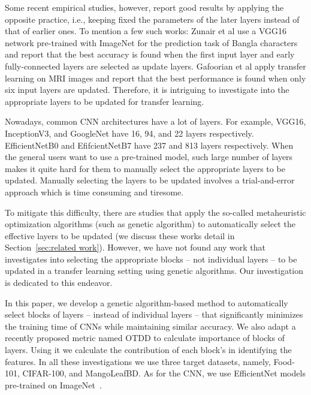 \documentclass[a4paper,fleqn]{cas-sc}
\begin{document}
Some recent empirical studies, however, report good results by applying the opposite practice, i.e., keeping fixed the parameters of the later layers instead of that of earlier ones. To mention a few such works: Zunair et al \cite{ZunairMuhammedMomen2018} use a VGG16 network \cite{ShimonyanZisserman2015} pre-trained with ImageNet for the prediction task of Bangla characters and report that the best accuracy is found when the first input layer and early fully-connected layers are selected as update layers. Gafoorian et al \cite{Ghafoorian2017} apply transfer learning on MRI images and report that the best performance is found when only six input layers are updated. Therefore, it is intriguing to investigate into the appropriate  layers to be updated for transfer learning.


Nowadays, common CNN architectures have a lot of layers. For example, VGG16, InceptionV3, and GoogleNet have 16, 94, and 22 layers respectively. EfficientNetB0 and EfifcientNetB7 \cite{TanLe2019} have 237 and 813 layers respectively. When the general users want to use a pre-trained model, such large number of layers  makes it quite hard for them to manually select the appropriate layers to be updated. Manually selecting the layers to be updated involves a trial-and-error approach which is time consuming and tiresome.

To mitigate this difficulty, there are studies that apply the so-called metaheuristic optimization algorithms (such as genetic algorithm) to automatically select the effective layers to be updated (we discuss these works detail in Section~\ref{sec:related work}). However, we have not found any work that investigates into selecting the appropriate blocks -- not individual layers -- to be updated in a transfer learning setting using genetic algorithms. Our investigation is dedicated to this endeavor.

In this paper, %
we develop a genetic algorithm-based method to automatically select blocks of layers -- instead of individual layers -- that significantly minimizes the training time of CNNs while maintaining similar accuracy. We also adapt a recently proposed metric named OTDD \cite{DavidNicolo2020} to calculate importance of blocks of layers. Using it we calculate the contribution of each block's in identifying the features. In all these investigations we use three target datasets, namely, Food-101, CIFAR-100, and MangoLeafBD. As for the CNN, we use EfficientNet \cite{TanLe2019} models pre-trained on ImageNet~\cite{Deng2009}.
\end{document}
